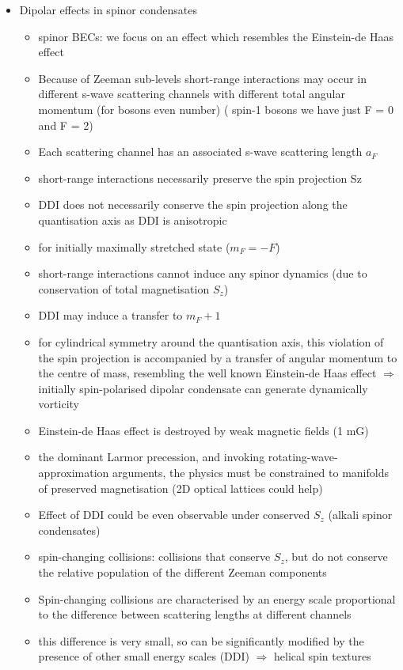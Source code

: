 \begin{itemize}
    \item Dipolar effects in spinor condensates
    \begin{itemize}
        \item spinor BECs: we focus on an effect which resembles the Einstein-de Haas effect
        \item Because of Zeeman sub-levels short-range interactions may occur in different s-wave scattering channels
            with different total angular momentum (for bosons even number) ( spin-1 bosons we have just F = 0 and F = 2)
        \item Each scattering channel has an associated s-wave scattering length $a_{F}$
        \item short-range interactions necessarily preserve the spin projection Sz
        \item DDI does not necessarily conserve the spin projection along the quantisation axis as DDI is anisotropic
        \item for initially maximally stretched state ($m_{F} =  - F$)
        \item short-range interactions cannot induce any spinor dynamics
            (due to conservation of total magnetisation $S_{z}$)
        \item DDI may induce a transfer to $m_{F} + 1$
        \item for cylindrical symmetry around the quantisation axis, this violation of the spin projection
            is accompanied by a transfer of angular momentum to the centre of mass,
            resembling the well known Einstein-de Haas effect
            $\Rightarrow$ initially spin-polarised dipolar condensate can generate dynamically vorticity
        \item Einstein-de Haas effect is destroyed by weak magnetic fields (1 mG)
        \item the dominant Larmor precession, and invoking rotating-wave-approximation arguments,
            the physics must be constrained to manifolds of preserved magnetisation (2D optical lattices could help)
        \item Effect of DDI could be even observable under conserved $S_{z}$ (alkali spinor condensates)
        \item spin-changing collisions: collisions that conserve $S_{z}$,
            but do not conserve the relative population of the different Zeeman components
        \item Spin-changing collisions are characterised by an energy scale proportional
                to the difference between scattering lengths at different channels
        \item this difference is very small, so can be significantly modified by the presence
            of other small energy scales (DDI) $\Rightarrow$ helical spin textures
    \end{itemize}
\end{itemize}

